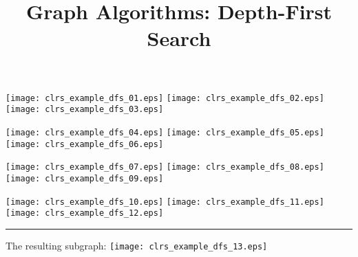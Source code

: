 \documentclass{article}
\title{Graph Algorithms: Depth-First Search}
\begin{document}
\maketitle\newcommand\HR{\rule{.5em}{.4pt}}
\vspace{1em}


\vspace{1em}


\texttt{[image: clrs\_example\_dfs\_01.eps]}
\vspace{1em}
\texttt{[image: clrs\_example\_dfs\_02.eps]}
\vspace{1em}
\texttt{[image: clrs\_example\_dfs\_03.eps]}
\vspace{1em}


\texttt{[image: clrs\_example\_dfs\_04.eps]}
\vspace{1em}
\texttt{[image: clrs\_example\_dfs\_05.eps]}
\vspace{1em}
\texttt{[image: clrs\_example\_dfs\_06.eps]}
\vspace{1em}


\texttt{[image: clrs\_example\_dfs\_07.eps]}
\vspace{1em}
\texttt{[image: clrs\_example\_dfs\_08.eps]}
\vspace{1em}
\texttt{[image: clrs\_example\_dfs\_09.eps]}
\vspace{1em}


\texttt{[image: clrs\_example\_dfs\_10.eps]}
\vspace{1em}
\texttt{[image: clrs\_example\_dfs\_11.eps]}
\vspace{1em}
\texttt{[image: clrs\_example\_dfs\_12.eps]}
\vspace{1em}


\HR
\begin{minipage}[b][.25\textheight]{0.303030303030303\linewidth}
The resulting subgraph: 
\texttt{[image: clrs\_example\_dfs\_13.eps]}
\end{minipage}
\end{document}
